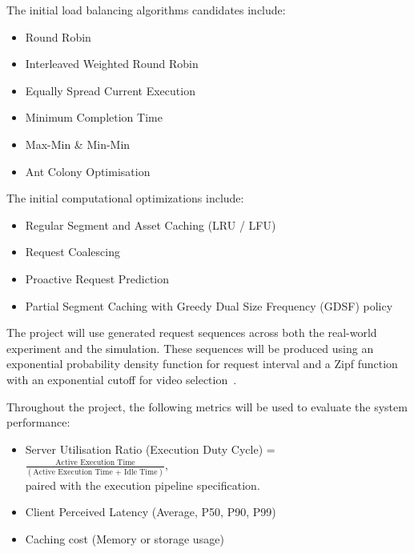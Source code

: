 \documentclass[11pt,a4paper]{article}
\begin{document}
The initial load balancing algorithms candidates include:
\begin{itemize}
    \item Round Robin~\cite{SHAFIQ20223910}
    \item Interleaved Weighted Round Robin~\cite{DBLP:journals/corr/abs-2003-08372}
    \item Equally Spread Current Execution~\cite{SHAFIQ20223910}
    \item Minimum Completion Time~\cite{BRAUN2001810}
    \item Max-Min \& Min-Min~\cite{SHAFIQ20223910,BRAUN2001810}
    \item Ant Colony Optimisation~\cite{SHAFIQ20223910,LB111}
\end{itemize}
The initial computational optimizations include:
\begin{itemize}
    \item Regular Segment and Asset Caching (LRU / LFU)
    \item Request Coalescing
    \item Proactive Request Prediction
    \item Partial Segment Caching with Greedy Dual Size Frequency (GDSF) policy~\cite{WGDSF}
\end{itemize}

The project will use generated request sequences across both the real-world experiment and the simulation.
These sequences will be produced using an exponential probability density function for request interval and
a Zipf function with an exponential cutoff for video selection~\cite{inproceedings}.

Throughout the project, the following metrics will be used to evaluate the system performance:
\begin{itemize}
\item Server Utilisation Ratio (Execution Duty Cycle) = $\frac{\text{Active Execution Time}} {(\text{Active Execution Time + Idle Time})}$, \\ paired with the execution pipeline specification.
\item Client Perceived Latency (Average, P50, P90, P99)
\item Caching cost (Memory or storage usage)
\end{itemize}
\end{document}
